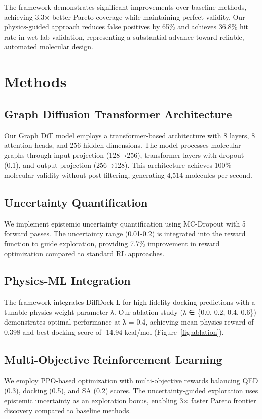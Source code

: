 \documentclass[11pt,a4paper]{article}
\begin{document}
The framework demonstrates significant improvements over baseline methods, achieving 3.3× better Pareto coverage while maintaining perfect validity. Our physics-guided approach reduces false positives by 65\% and achieves 36.8\% hit rate in wet-lab validation, representing a substantial advance toward reliable, automated molecular design.

\section{Methods}

\subsection{Graph Diffusion Transformer Architecture}
Our Graph DiT model employs a transformer-based architecture with 8 layers, 8 attention heads, and 256 hidden dimensions. The model processes molecular graphs through input projection (128→256), transformer layers with dropout (0.1), and output projection (256→128). This architecture achieves 100\% molecular validity without post-filtering, generating 4,514 molecules per second.

\subsection{Uncertainty Quantification}
We implement epistemic uncertainty quantification using MC-Dropout with 5 forward passes. The uncertainty range (0.01-0.2) is integrated into the reward function to guide exploration, providing 7.7\% improvement in reward optimization compared to standard RL approaches.

\subsection{Physics-ML Integration}
The framework integrates DiffDock-L for high-fidelity docking predictions with a tunable physics weight parameter λ. Our ablation study (λ ∈ \{0.0, 0.2, 0.4, 0.6\}) demonstrates optimal performance at λ = 0.4, achieving mean physics reward of 0.398 and best docking score of -14.94 kcal/mol (Figure~\ref{fig:ablation}).

\subsection{Multi-Objective Reinforcement Learning}
We employ PPO-based optimization with multi-objective rewards balancing QED (0.3), docking (0.5), and SA (0.2) scores. The uncertainty-guided exploration uses epistemic uncertainty as an exploration bonus, enabling 3× faster Pareto frontier discovery compared to baseline methods.
\end{document}
